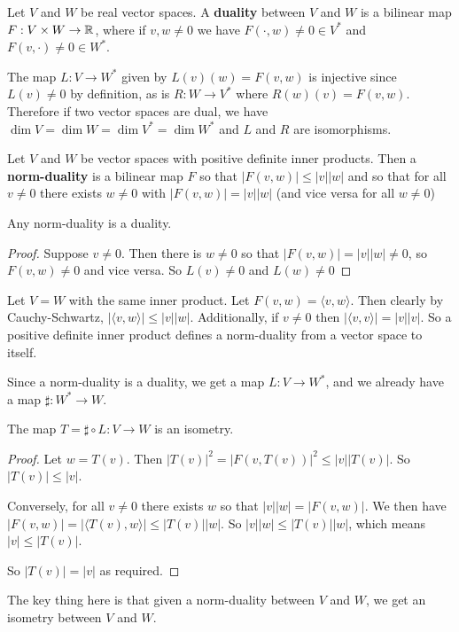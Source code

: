 \begin{defn}[Duality]
Let $V$ and $W$ be real vector spaces. A \textbf{duality} between $V$ and $W$ is a bilinear map $F : V\times W \to \operatorname{\mathbb{R}}$, where if $v,w\neq 0$ we have $F(\cdot,w)\neq 0 \in V^*$ and $F(v,\cdot)\neq 0\in W^*$.
\end{defn}
\begin{remark*}
    The map $L : V\to W^*$ given by $L(v)(w) = F(v,w)$ is injective since $L(v)\neq 0$ by definition, as is $R : W\to V^*$ where $R(w)(v)=F(v,w)$. Therefore if two vector spaces are dual, we have $\dim V = \dim W = \dim V^* = \dim W^*$ and $L$ and $R$ are isomorphisms.
\end{remark*}
\begin{defn}
Let $V$ and $W$ be vector spaces with positive definite inner products. Then a \textbf{norm-duality} is a bilinear map $F$ so that $|F(v,w)|\leq |v||w|$ and so that for all $v\neq 0$ there exists $w\neq 0$ with $|F(v,w)|=|v||w|$ (and vice versa for all $w\neq 0$)
\end{defn}
\begin{lemma}
    Any norm-duality is a duality.
\end{lemma}
\begin{proof}
    Suppose $v\neq 0$. Then there is $w\neq 0$ so that $|F(v,w)|=|v||w|\neq 0$, so $F(v,w)\neq 0$ and vice versa. So $L(v)\neq 0$ and $L(w)\neq 0$
\end{proof}
\begin{example}
    Let $V=W$ with the same inner product. Let $F(v,w) = \langle v,w\rangle$. Then clearly by Cauchy-Schwartz, $|\langle v,w\rangle | \leq |v||w|$. Additionally, if $v\neq 0$ then $|\langle v,v\rangle| = |v||v|$. So a positive definite inner product defines a norm-duality from a vector space to itself.
\end{example}

\begin{remark*}
    Since a norm-duality is a duality, we get a map $L : V \to W^*$, and we already have a map $\sharp : W^* \to W$.
\end{remark*}
\begin{lemma}
    The map $T = \sharp\circ L : V\to W$ is an isometry.
\end{lemma}
\begin{proof}
    Let $w = T(v)$. Then $|T(v)|^2 = |F(v,T(v))|^2 \leq |v||T(v)|$. So $|T(v)|\leq |v|$. 

    Conversely, for all $v\neq 0$ there exists $w$ so that $|v||w| = |F(v,w)|$. We then have $|F(v,w)| = |\langle T(v),w\rangle| \leq |T(v)||w|$. So $|v||w|\leq |T(v)||w|$, which means $|v|\leq |T(v)|$.

    So $|T(v)|=|v|$ as required.
\end{proof}
\begin{remark*}
    The key thing here is that given a norm-duality between $V$ and $W$, we get an isometry between $V$ and $W$.
\end{remark*}

